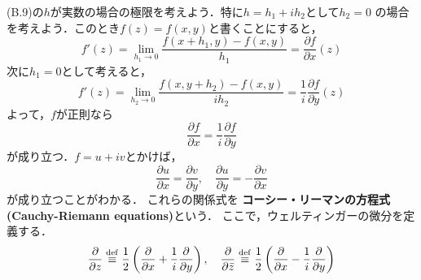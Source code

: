 
\noindent
(B.9)の$h$が実数の場合の極限を考えよう．特に$h = h_{1} + ih_{2}$として$h_{2} = 0$
の場合を考えよう．このとき$f(z) = f(x,y)$と書くことにすると，
\begin{equation}
  f'(z) = \lim_{h_{1} \to 0}\frac{f(x + h_{1},y) - f(x,y)}{h_{1}} = \frac{\partial f}{\partial x}(z)
\end{equation}
次に$h_{1} = 0$として考えると，
\begin{equation}
  f'(z) = \lim_{h_{2} \to 0}\frac{f(x,y + h_{2}) - f(x,y)}{ih_{2}} = \frac{1}{i}\frac{\partial f}{\partial y}(z)
\end{equation}
よって，$f$が正則なら
\begin{equation}
  \frac{\partial f}{\partial x} = \frac{1}{i}\frac{\partial f}{\partial y}
\end{equation}
が成り立つ．$f = u + iv$とかけば，
\begin{equation}
  \frac{\partial u}{\partial x} = \frac{\partial v}{\partial y},\quad \frac{\partial u}{\partial y} = - \frac{\partial v}{\partial x}
\end{equation}
が成り立つことがわかる．
これらの関係式を
\textbf{コーシー・リーマンの方程式(Cauchy-Riemann equations)}という．
ここで，ウェルティンガーの微分を定義する．
\begin{equation}
  \frac{\partial}{\partial z}\stackrel{\mathrm{def}}{\equiv} \frac{1}{2}\left( \frac{\partial}{\partial x} + \frac{1}{i}\frac{\partial}{\partial y} \right),\quad \frac{\partial}{\partial \bar{z}} \stackrel{\mathrm{def}}{\equiv} \frac{1}{2}\left( \frac{\partial}{\partial x} - \frac{1}{i}\frac{\partial}{\partial y} \right)
\end{equation}



